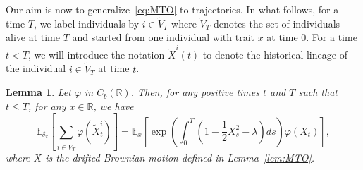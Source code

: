 \documentclass[10pt]{amsart}
\newtheorem{lemm}[theo]{Lemma}\newtheorem{prop}[theo]{Proposition}\newtheorem{coro}[theo]{Corollary}\newtheorem{conj}[theo]{Conjecture}
\theoremstyle{definition}\newtheorem{defi}[theo]{Definition}\newtheorem{rema}[theo]{Remark}\newtheorem{exam}[theo]{Example}\newtheorem{exem}[theo]{Example}\newtheorem{nota}[theo]{Notation}
\newcommand*\R{\mathbb{R}}
\newcommand*\E{\mathbb{E}}
\begin{document}
Our aim is now to generalize~\eqref{eq:MTO} to trajectories. In what follows, for a time $T$, we label individuals by $i\in \widetilde{V}_T$ where $\widetilde{V}_{T}$ denotes the set of individuals alive at time $T$ and started from one individual with trait $x$ at time $0$. For a time $t<T$, we will introduce the notation $\widetilde{X}^i(t)$ to denote the historical lineage of the individual $i\in \widetilde{V}_{T}$ at time $t$.



\begin{lemm}\label{lem:MTO05}
Let $\varphi$ in $C_{b}(\R)$. Then, for any positive times $t$ and $T$ such that $t\leq T$, for any $x\in \R$, we have
\begin{equation}\label{eq:MTO05}
\E_{\delta_{x}}\left[\sum_{i \in \widetilde{V}_{T}} \varphi\left(\widetilde{X}^{i}_{t}\right) \right]=\E_{x}\left[\exp\left(\int_{0}^{T} \left(1-\frac{1}{2}X_{s}^{2}-\lambda \right)ds \right)\varphi\left(X_{t}\right) \right],
\end{equation}
where $X$ is the drifted Brownian motion defined in Lemma~\ref{lem:MTO}.
\end{lemm}
\end{document}
